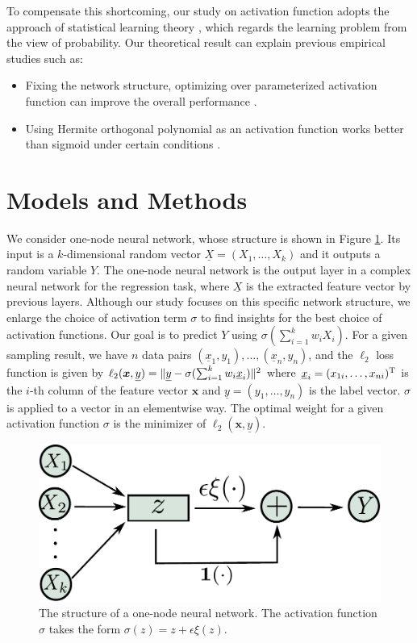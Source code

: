 \documentclass[appliedmath,article,accept,pdftex,moreauthors]{Definitions/mdpi}
\begin{document}
To compensate this shortcoming, our study on activation function adopts the approach of statistical learning theory \cite{vapnik1999nature},
which regards the learning problem from the view of probability.
Our theoretical result can explain previous empirical studies such as:
\begin{itemize}
\item Fixing the network structure, optimizing over parameterized activation function can improve the overall performance \cite{ramachandran2017searching}.
\item Using Hermite orthogonal polynomial as an activation function works better than sigmoid
under certain conditions \cite{ma2005constructive}.
\end{itemize}

\section{Models and Methods}\label{sec:mm}
We consider one-node neural network, whose structure is shown in Figure \ref{fig:ns}.
Its input is a $k$-dimensional random vector $\underline{X}=(X_1, \dots, X_k)$ and it outputs a random variable $Y$.
The one-node neural network is the output layer in a complex neural network for the regression task, where
$\underline{X}$ is the extracted feature vector by previous layers.
Although our study focuses on this specific network structure, we enlarge the choice of activation term $\sigma$ to find insights
for the best choice of activation functions.
Our goal is to predict $Y$ using $ \sigma(\sum_{i=1}^k w_i X_i)$.
For a given sampling result, we have $n$ data pairs $(\underline{x}_1, y_1), \dots, (\underline{x}_n, y_n)$, and
the $\ell_2$ loss function is given by
$\ell_2(\bm{x},\underline{y}) = \lVert\underline{y} - \sigma(\sum_{i=1}^k w_i \underline{x}_i)\rVert^2 $
where $\underline{x}_i= (x_{1i}, \dots, x_{ni})^{\mathrm{T}}$ is the $i$-th column of the feature vector $\bm{x}$ and
$\underline{y} = (y_1, \dots, y_n)$ is the label vector. $\sigma$ is applied to a vector in an  elementwise way.
The optimal weight for a given activation function $\sigma$ is the minimizer of $\ell_2(\bm{x},\underline{y})$.
\begin{figure}[H]
\includegraphics[width=13.7cm]{network_structure.pdf}
\caption{The structure of a one-node neural network. The activation function $\sigma$ takes the form $\sigma(z)=z + \epsilon \xi(z)$.}%
\label{fig:ns}
\end{figure}
\end{document}
